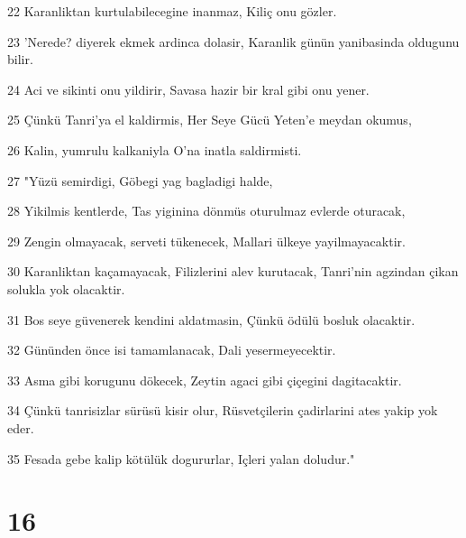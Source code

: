 \par 22 Karanliktan kurtulabilecegine inanmaz, Kiliç onu gözler.
\par 23 'Nerede? diyerek ekmek ardinca dolasir, Karanlik günün yanibasinda oldugunu bilir.
\par 24 Aci ve sikinti onu yildirir, Savasa hazir bir kral gibi onu yener.
\par 25 Çünkü Tanri'ya el kaldirmis, Her Seye Gücü Yeten'e meydan okumus,
\par 26 Kalin, yumrulu kalkaniyla O'na inatla saldirmisti.
\par 27 "Yüzü semirdigi, Göbegi yag bagladigi halde,
\par 28 Yikilmis kentlerde, Tas yiginina dönmüs oturulmaz evlerde oturacak,
\par 29 Zengin olmayacak, serveti tükenecek, Mallari ülkeye yayilmayacaktir.
\par 30 Karanliktan kaçamayacak, Filizlerini alev kurutacak, Tanri'nin agzindan çikan solukla yok olacaktir.
\par 31 Bos seye güvenerek kendini aldatmasin, Çünkü ödülü bosluk olacaktir.
\par 32 Gününden önce isi tamamlanacak, Dali yesermeyecektir.
\par 33 Asma gibi korugunu dökecek, Zeytin agaci gibi çiçegini dagitacaktir.
\par 34 Çünkü tanrisizlar sürüsü kisir olur, Rüsvetçilerin çadirlarini ates yakip yok eder.
\par 35 Fesada gebe kalip kötülük dogururlar, Içleri yalan doludur."

\chapter{16}

